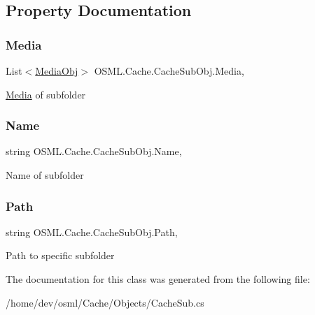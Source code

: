 \subsection{Property Documentation}
\mbox{\label{classOSML_1_1Cache_1_1CacheSubObj_a99b9e9474b6941657419e33fdca1688b}} 
\subsubsection{\texorpdfstring{Media}{Media}}
{\footnotesize\ttfamily List$<$\mbox{\hyperlink{classOSML_1_1Media_1_1MediaObj}{Media\+Obj}}$>$ O\+S\+M\+L.\+Cache.\+Cache\+Sub\+Obj.\+Media\hspace{0.3cm}{\ttfamily [get]}, {\ttfamily [set]}}



\mbox{\hyperlink{namespaceOSML_1_1Media}{Media}} of subfolder 

\mbox{\label{classOSML_1_1Cache_1_1CacheSubObj_a3eb622bfe319c5e4343012487b7000e4}} 
\subsubsection{\texorpdfstring{Name}{Name}}
{\footnotesize\ttfamily string O\+S\+M\+L.\+Cache.\+Cache\+Sub\+Obj.\+Name\hspace{0.3cm}{\ttfamily [get]}, {\ttfamily [set]}}



Name of subfolder 

\mbox{\label{classOSML_1_1Cache_1_1CacheSubObj_ab221125b0dc1a4669b9698bfa0fa0d07}} 
\subsubsection{\texorpdfstring{Path}{Path}}
{\footnotesize\ttfamily string O\+S\+M\+L.\+Cache.\+Cache\+Sub\+Obj.\+Path\hspace{0.3cm}{\ttfamily [get]}, {\ttfamily [set]}}



Path to specific subfolder 



The documentation for this class was generated from the following file\+:\begin{DoxyCompactItemize}
\item 
/home/dev/osml/\+Cache/\+Objects/Cache\+Sub.\+cs\end{DoxyCompactItemize}
